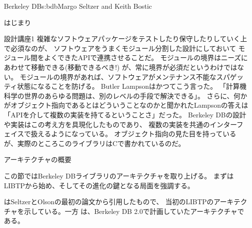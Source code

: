 \begin{aosachapter}{Berkeley DB}{s:bdb}{Margo Seltzer and Keith Bostic}
\begin{aosasect1}{はじまり}
\begin{aosabox}{設計講座1}
複雑なソフトウェアパッケージをテストしたり保守したりしていく上で必須なのが、
ソフトウェアをうまくモジュール分割した設計にしておいて
モジュール間をよくできたAPIで連携させることだ。
モジュールの境界はニーズにあわせて移動できる(移動できるべき!)
が、常に境界が必須だというわけではない。
モジュールの境界があれば、ソフトウェアがメンテナンス不能なスパゲッティ状態になることを防げる。
Butler Lampsonはかつてこう言った。
「計算機科学の世界のあらゆる問題は、別のレベルの手段で解決できる」。
さらに、何かがオブジェクト指向であるとはどういうことなのかと聞かれたLampsonの答えは
「APIを介して複数の実装を持てるということさ」だった。
Berkeley DBの設計や実装はこの考え方を具現化したものであり、
複数の実装を共通のインターフェイスで扱えるようになっている。
オブジェクト指向の見た目を持っているが、実際のところこのライブラリはCで書かれているのだ。

\end{aosabox}

\end{aosasect1}

\begin{aosasect1}{アーキテクチャの概要}

この節ではBerkeley DBライブラリのアーキテクチャを取り上げる。
まずはLIBTPから始め、そしてその進化の鍵となる局面を強調する。

はSeltzerとOlsonの最初の論文から引用したもので、
当初のLIBTPのアーキテクチャを示している。一方
は、Berkeley DB 2.0で計画していたアーキテクチャである。


\end{aosasect1}
\end{aosachapter}
